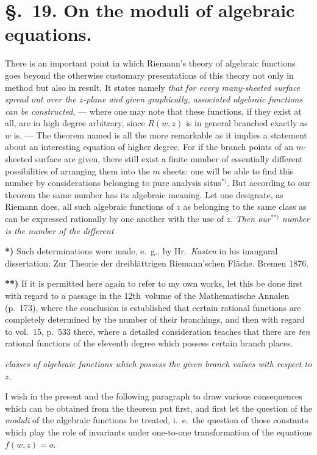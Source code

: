 \documentclass{article}
\begin{document}
\section*{§.~19. On the moduli of algebraic equations.}

There is an important point in which Riemann's theory of algebraic functions goes beyond the otherwise customary presentations of this theory not only in method but also in result. It states namely \emph{that for every many-sheeted surface spread out over the $z$-plane and given graphically, associated algebraic functions can be constructed}, --- where one may note that these functions, if they exist at all, are in high degree arbitrary, since $R(w, z)$ is in general branched exactly as $w$ is. --- The theorem named is all the more remarkable as it implies a statement about an interesting equation of higher degree. For if the branch points of an $m$-sheeted surface are given, there still exist a finite number of essentially different possibilities of arranging them into the $m$ sheets: one will be able to find this number by considerations belonging to pure analysis situs${}^{*)}$. But according to our theorem the same number has its algebraic meaning. Let one designate, as Riemann does, all such algebraic functions of $z$ as belonging to the same class as can be expressed rationally by one another with the use of $z$. \emph{Then our}${}^{**)}$ \emph{number is the number of the different}

\textbf{*)} Such determinations were made, e.\ g., by Hr.\ \emph{Kasten} in his inaugural dissertation: Zur Theorie der dreiblättrigen Riemann'schen Fläche. Bremen 1876.

\textbf{**)} If it is permitted here again to refer to my own works, let this be done first with regard to a passage in the 12th\ volume of the Mathematische Annalen (p.~173), where the conclusion is established that certain rational functions are completely determined by the number of their branchings, and then with regard to vol.~15, p.~533 there, where a detailed consideration teaches that there are \emph{ten} rational functions of the eleventh degree which possess certain branch places.

\emph{classes of algebraic functions which possess the given branch values with respect to $z$.}

I wish in the present and the following paragraph to draw various consequences which can be obtained from the theorem put first, and first let the question of the \emph{moduli} of the algebraic functions be treated, i.\ e.\ the question of those constants which play the role of invariants under one-to-one transformation of the equations $f(w, z) = o$.
\end{document}
